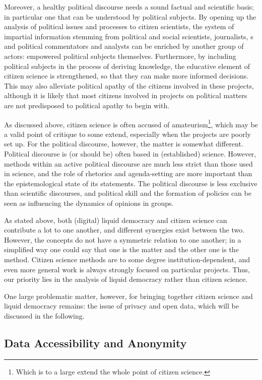 Moreover, a healthy political discourse needs a sound factual and scientific basis; in particular one that can be understood by political subjects. By opening up the analysis of political issues and processes to citizen scientists, the system of impartial information stemming from political and social scientists, journalists, s and political commentators and analysts can be enriched by another group of actors: empowered political subjects themselves. Furthermore, by including political subjects in the process of deriving knowledge, the educative element of citizen science is strengthened, so that they can make more informed decisions. This may also alleviate political apathy of the citizens involved in these projects, although it is likely that most citizens involved in  projects on political matters are not predisposed to political apathy to begin with.

As discussed above, citizen science is often accused of amateurism\footnote{Which is to a large extend the whole point of citizen science.}, which may be a valid point of critique to some extend, especially when the projects are poorly set up. For the political discourse, however, the matter is somewhat different. Political discourse is (or should be) often based in (established) science. However, methods within an active political discourse are much less strict than those used in science, and the role of rhetorics and agenda-setting are more important than the epistemological state of its statements. The political discourse is less exclusive than scientific discourses, and political skill and the formation of policies can be seen as influencing the dynamics of opinions in groups.

As stated above, both (digital) liquid democracy and citizen science can contribute a lot to one another, and different synergies exist between the two. However, the concepts do not have a symmetric relation to one another; in a simplified way one could say that one is the matter and the other one is the method. Citizen science methods are to some degree institution-dependent, and even more general work is always strongly focused on particular projects. Thus, our priority lies in the analysis of liquid democracy rather than citizen science.

One large problematic matter, however, for bringing together citizen science and liquid democracy remains: the issue of privacy and open data, which will be discussed in the following.


\subsection{Data Accessibility and Anonymity}
\label{ssec:Integration_AccessibilityAnonymity}

